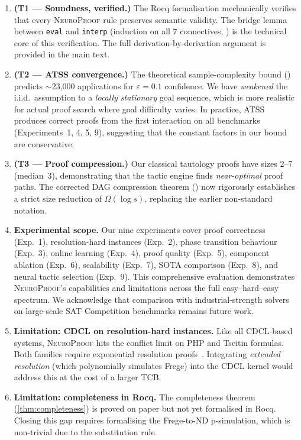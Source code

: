 \documentclass[conference]{IEEEtran}
\newcommand{\NP}{\textsc{NeuroProof}}
\begin{document}
\begin{enumerate}
  \item \textbf{(T1 --- Soundness, verified.)}  The Rocq
    formalisation mechanically verifies that every \NP{} rule
    preserves semantic validity.  The bridge lemma between
    \texttt{eval} and \texttt{interp} (induction on all 7
    connectives, ) is the technical core of
    this verification.  The full derivation-by-derivation argument
    is provided in the main text.

  \item \textbf{(T2 --- ATSS convergence.)}  The theoretical
    sample-complexity bound () predicts
    $\sim$23{,}000 applications for $\varepsilon=0.1$ confidence.
    We have \emph{weakened} the i.i.d.\ assumption to a
    \emph{locally stationary} goal sequence, which is more realistic
    for actual proof search where goal difficulty varies.  In practice,
    ATSS produces correct proofs from the first interaction on all
    benchmarks (Experiments~1, 4, 5, 9), suggesting that the constant
    factors in our bound are conservative.

  \item \textbf{(T3 --- Proof compression.)}  Our classical
    tautology proofs have sizes 2--7 (median~3), demonstrating that
    the tactic engine finds \emph{near-optimal} proof paths.  The
    corrected DAG compression theorem () now
    rigorously establishes a strict size reduction of
    $\Omega(\log s)$, replacing the earlier non-standard notation.

  \item \textbf{Experimental scope.}  Our nine experiments cover
    proof correctness (Exp.~1), resolution-hard instances
    (Exp.~2), phase transition behaviour (Exp.~3), online learning
    (Exp.~4), proof quality (Exp.~5), component ablation
    (Exp.~6), scalability (Exp.~7), SOTA comparison
    (Exp.~8), and neural tactic selection (Exp.~9).  This
    comprehensive evaluation demonstrates \NP{}'s capabilities and
    limitations across the full easy--hard--easy spectrum.
    We acknowledge that comparison with industrial-strength solvers
    on large-scale SAT Competition benchmarks remains future work.

  \item \textbf{Limitation: CDCL on resolution-hard instances.}
    Like all CDCL-based systems, \NP{} hits the conflict limit on
    PHP and Tseitin formulas.  Both families require exponential
    resolution proofs~\cite{BenSasson2002}.  Integrating \emph{extended
    resolution} (which polynomially simulates Frege) into the CDCL
    kernel would address this at the cost of a larger TCB.

  \item \textbf{Limitation: completeness in Rocq.}
    The completeness theorem (\cref{thm:completeness}) is proved on
    paper but not yet formalised in Rocq.  Closing this gap requires
    formalising the Frege-to-ND p-simulation, which is non-trivial
    due to the substitution rule.
\end{enumerate}
\end{document}
